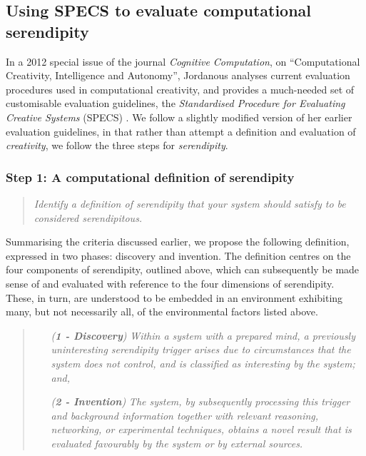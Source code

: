 \documentclass{llncs}
\begin{document}
\subsection{Using SPECS to evaluate computational serendipity}\label{specs-overview}

In a 2012 special issue of the journal {\em Cognitive Computation}, on
``Computational Creativity, Intelligence and Autonomy'', Jordanous
analyses current evaluation procedures used in computational
creativity, and provides a much-needed set of customisable evaluation
guidelines, the \emph{Standardised Procedure for Evaluating Creative
  Systems} (SPECS) \cite{jordanous:12}.
%
We follow a slightly modified version of her earlier evaluation
guidelines, in that rather than attempt a definition and evaluation of
{\em creativity}, we follow the three steps for \emph{serendipity}.

\subsubsection*{Step 1: A computational definition of serendipity}
\begin{quote} {\em Identify a definition of serendipity that your
    system should satisfy to be considered serendipitous.}\end{quote}

Summarising the criteria discussed earlier, we propose the following
definition, expressed in two phases: discovery and invention.  The
definition centres on the four components of serendipity, outlined
above, which can subsequently be made sense of and evaluated with
reference to the four dimensions of serendipity.  These, in turn, are
understood to be embedded in an environment exhibiting many, but not
necessarily all, of the environmental factors listed above.

\begin{quote}
\begin{enumerate}[itemsep=2pt,labelwidth=9em,leftmargin=6em,rightmargin=2em]
\item[\emph{(\textbf{1 - Discovery})}] \emph{Within a system with a prepared mind, a previously uninteresting serendipity trigger arises due to circumstances that the system does not control, and is classified as interesting by the system; and,}
\item[\emph{(\textbf{2 - Invention})}] \emph{The system, by subsequently processing this trigger and background information together with relevant reasoning, networking, or experimental techniques, obtains a novel result that is evaluated favourably by the system or by external sources.}
\end{enumerate}
\end{quote}
\end{document}
